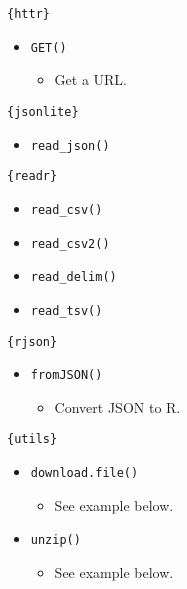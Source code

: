 \documentclass[
]{book}
\providecommand{\tightlist}{%
  \setlength{\itemsep}{0pt}\setlength{\parskip}{0pt}}
\begin{document}
\texttt{\{httr\}}

\begin{itemize}
\tightlist
\item
  \texttt{GET()}

  \begin{itemize}
  \tightlist
  \item
    Get a URL.
  \end{itemize}
\end{itemize}

\texttt{\{jsonlite\}}

\begin{itemize}
\tightlist
\item
  \texttt{read\_json()}
\end{itemize}

\texttt{\{readr\}}

\begin{itemize}
\tightlist
\item
  \texttt{read\_csv()}
\item
  \texttt{read\_csv2()}
\item
  \texttt{read\_delim()}
\item
  \texttt{read\_tsv()}
\end{itemize}

\texttt{\{rjson\}}

\begin{itemize}
\tightlist
\item
  \texttt{fromJSON()}

  \begin{itemize}
  \tightlist
  \item
    Convert JSON to R.
  \end{itemize}
\end{itemize}

\texttt{\{utils\}}

\begin{itemize}
\tightlist
\item
  \texttt{download.file()}

  \begin{itemize}
  \tightlist
  \item
    See example below.
  \end{itemize}
\item
  \texttt{unzip()}

  \begin{itemize}
  \tightlist
  \item
    See example below.
  \end{itemize}
\end{itemize}
\end{document}
